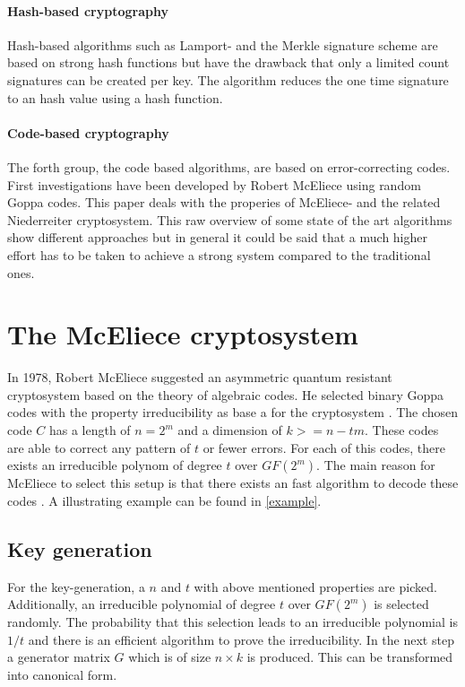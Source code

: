 \paragraph*{Hash-based cryptography}
Hash-based algorithms such as Lamport- \cite{wiki:lamportsig} and the Merkle \cite{wiki:merklesig} signature scheme are based on strong hash functions but have the drawback that only a limited count signatures can be created per key. The algorithm reduces the one time signature to an hash value using a hash function\cite{bernstein2009introduction}.

\paragraph*{Code-based cryptography}
The forth group, the code based algorithms, are based on error-correcting codes. First investigations have been developed by Robert McEliece using random Goppa codes\cite{wiki:bingoppa}. This paper deals with the properies of McEliece- and the related Niederreiter cryptosystem\cite{bernstein2009introduction}\cite{wiki:niederreither}.
\newline
\newline
This raw overview of some state of the art algorithms show different approaches but in general it could be said that a much higher effort has to be taken to achieve a strong system compared to the traditional ones. 

\section{The McEliece cryptosystem}
\label{mceliece}
In 1978, Robert McEliece suggested an asymmetric quantum resistant cryptosystem based on the theory of algebraic codes. He selected binary Goppa codes with the property irreducibility as base a for the cryptosystem \cite{mceliece1978public}. The chosen code $C$ has a length of $n = 2^m$ and a dimension of $k >= n - tm$. These codes are able to correct any pattern of $t$ or fewer errors. 
For each of this codes, there exists an irreducible polynom of degree $t$ over $GF(2^m)$. 
The main reason for McEliece to select this setup is that there exists an fast algorithm to decode these codes \cite{mceliece2002theory}.
\newline
A illustrating example can be found in \ref{example}.

\subsection*{Key generation}
For the key-generation, a $n$ and $t$ with above mentioned properties are picked. Additionally, an irreducible polynomial of degree $t$ over $GF(2^m)$  is selected randomly. The probability that this selection leads to an irreducible polynomial is $1/t$ and there is an efficient algorithm to prove the irreducibility\cite{berlekamp1968algebraic}.
In the next step a generator matrix $G$ which is of size $n \times k$ is produced. This can be transformed into canonical form. 

